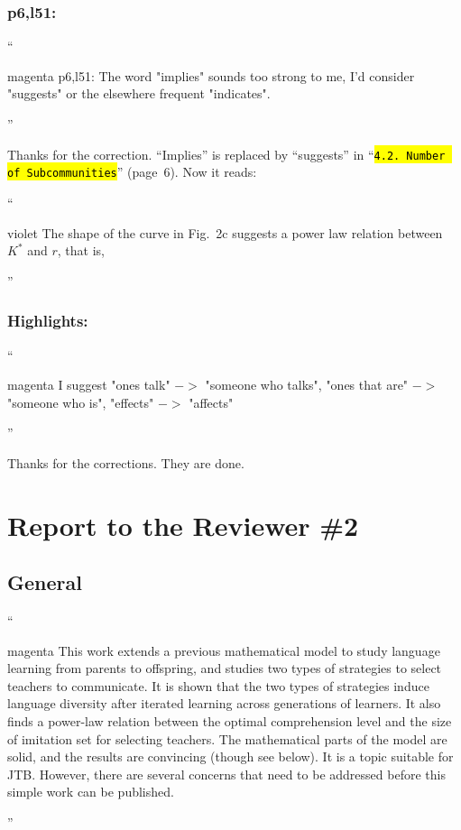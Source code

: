 \documentclass[10.5pt]{amsart}
\newcommand{\reffig}[1]{Fig.~\ref{#1}}
\newcommand{\hbColorReviewer}{magenta}
\newcommand{\hbColorManuscript}{violet}
\newenvironment{hbReviewer}
	{\list{}{\leftmargin=2cm\rightmargin=1cm}\item[]``\begin{footnotesize}
	\begin{color}{\hbColorReviewer}}	
	{\end{color}\end{footnotesize}''\endlist}
\newcommand{\hbMRefP}[2]{``\texttt{{\color{\hbColorManuscript}\hl{#1}}}''  (page~#2)}
\newenvironment{hbChanged}
	{\list{}{\leftmargin=1cm\rightmargin=1.5cm}\item[]``\begin{small}
	\begin{color}{\hbColorManuscript}}	
	{\end{color}\end{small}''\endlist}
\newcommand{\hbMNumberOfSubcommunities}{\hbMRefP{4.2. Number of Subcommunities}{6}}
\newcommand{\hbOpt}[1]{{#1}^*}
\begin{document}
\subsubsection{p6,l51:}
\begin{hbReviewer}
	p6,l51: 
	The word "implies" sounds too strong to me, I'd consider "suggests" or 
	the elsewhere frequent "indicates".
\end{hbReviewer}

Thanks for the correction.
``Implies'' is replaced by ``suggests'' in \hbMNumberOfSubcommunities.
Now it reads:
	\begin{hbChanged}
	The shape of the curve in 
	Fig.~2c %
	suggests a power law relation between $\hbOpt{K}$ and $r$, 
	that is,
\end{hbChanged}




\subsubsection{Highlights:}
\begin{hbReviewer}
	I suggest 
	"ones talk" $->$ "someone who talks", 
	"ones that are" $->$ "someone who is", 
	"effects" $->$ "affects"
\end{hbReviewer}

Thanks for the corrections. They are done.







\section{Report to the Reviewer \#2}




\subsection{General}
\begin{hbReviewer}
	This work extends a previous mathematical model 
	to study language learning from parents to offspring, 
	and studies two types of strategies to select teachers to communicate. 
	It is shown that the two types of strategies induce language diversity 
	after iterated learning across generations of learners. 
	It also finds a power-law relation between the optimal comprehension level 
	and the size of imitation set for selecting teachers. 
	The mathematical parts of the model are solid, 
	and the results are convincing (though see below). 
	It is a topic suitable for JTB. 
	However, there are several concerns 
	that need to be addressed before this simple work can be published. 
\end{hbReviewer}
\end{document}

